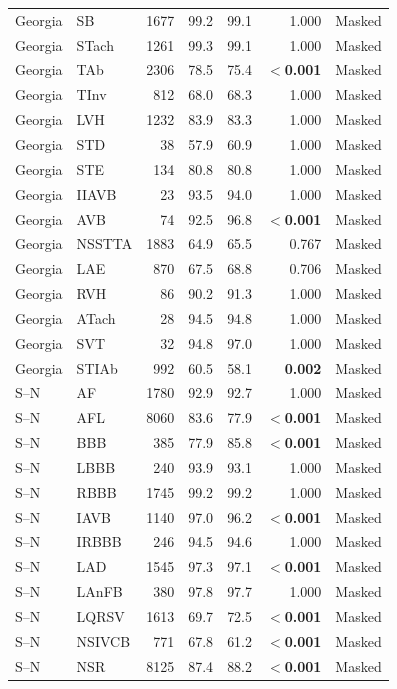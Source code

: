 \begin{longtable}{@{}llrrrrl@{}}
Georgia & SB & 1677 & 99.2 & 99.1 & 1.000 & Masked \\
Georgia & STach & 1261 & 99.3 & 99.1 & 1.000 & Masked \\
Georgia & TAb & 2306 & 78.5 & 75.4 & \textbf{$<$0.001} & Masked \\
Georgia & TInv & 812 & 68.0 & 68.3 & 1.000 & Masked \\
Georgia & LVH & 1232 & 83.9 & 83.3 & 1.000 & Masked \\
Georgia & STD & 38 & 57.9 & 60.9 & 1.000 & Masked \\
Georgia & STE & 134 & 80.8 & 80.8 & 1.000 & Masked \\
Georgia & IIAVB & 23 & 93.5 & 94.0 & 1.000 & Masked \\
Georgia & AVB & 74 & 92.5 & 96.8 & \textbf{$<$0.001} & Masked \\
Georgia & NSSTTA & 1883 & 64.9 & 65.5 & 0.767 & Masked \\
Georgia & LAE & 870 & 67.5 & 68.8 & 0.706 & Masked \\
Georgia & RVH & 86 & 90.2 & 91.3 & 1.000 & Masked \\
Georgia & ATach & 28 & 94.5 & 94.8 & 1.000 & Masked \\
Georgia & SVT & 32 & 94.8 & 97.0 & 1.000 & Masked \\
Georgia & STIAb & 992 & 60.5 & 58.1 & \textbf{0.002} & Masked \\
\midrule
S--N & AF & 1780 & 92.9 & 92.7 & 1.000 & Masked \\
S--N & AFL & 8060 & 83.6 & 77.9 & \textbf{$<$0.001} & Masked \\
S--N & BBB & 385 & 77.9 & 85.8 & \textbf{$<$0.001} & Masked \\
S--N & LBBB & 240 & 93.9 & 93.1 & 1.000 & Masked \\
S--N & RBBB & 1745 & 99.2 & 99.2 & 1.000 & Masked \\
S--N & IAVB & 1140 & 97.0 & 96.2 & \textbf{$<$0.001} & Masked \\
S--N & IRBBB & 246 & 94.5 & 94.6 & 1.000 & Masked \\
S--N & LAD & 1545 & 97.3 & 97.1 & \textbf{$<$0.001} & Masked \\
S--N & LAnFB & 380 & 97.8 & 97.7 & 1.000 & Masked \\
S--N & LQRSV & 1613 & 69.7 & 72.5 & \textbf{$<$0.001} & Masked \\
S--N & NSIVCB & 771 & 67.8 & 61.2 & \textbf{$<$0.001} & Masked \\
S--N & NSR & 8125 & 87.4 & 88.2 & \textbf{$<$0.001} & Masked \\

\end{longtable}
